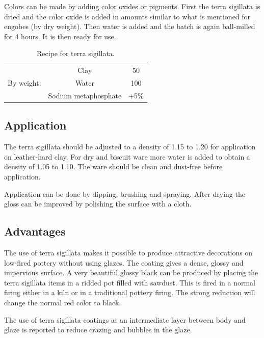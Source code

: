 Colors can be made by adding color oxides or pigments. First the terra 
sigillata is dried and the color oxide is added in amounts similar to what is 
mentioned for engobes (by dry weight). Then water is added and the batch is 
again ball-milled for 4 hours. It is then ready for use.
\begin{table}\centering
  \renewcommand{\arraystretch}{1.5}
  \begin{tabular}{|c|c|c|}\hline
    &Clay&50\\\cline{2-3}
    By weight:&Water&100\\\cline{2-3}
    &Sodium metaphosphate&+5\%\\\hline
  \end{tabular}
  \caption{Recipe for terra sigillata.}
  \label{tab:terrasig}
\end{table}
\subsection{Application}
The terra sigillata should be adjusted to a density of 1.15 to 1.20 for 
application on leather-hard clay. For dry and biscuit ware more water is added 
to obtain a density of 1.05 to 1.10. The ware should be clean and dust-free 
before application.

Application can be done by dipping, brushing and spraying. After drying the 
gloss can be improved by polishing the surface with a cloth.
\subsection{Advantages}
The use of terra sigillata makes it possible to produce attractive decorations 
on low-fired pottery without using glazes. The coating gives a dense, glossy 
and impervious surface. A very beautiful glossy black can be produced by 
placing the terra sigillata items in a ridded pot filled with sawdust. This is 
fired in a normal firing either in a kiln or in a traditional pottery firing. 
The strong reduction will change the normal red color to black.

The use of terra sigillata coatings as an intermediate layer between body and 
glaze is reported to reduce crazing and bubbles in the glaze.
